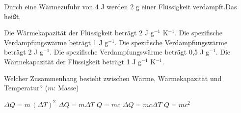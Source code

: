 \documentclass[11pt]{exam}
\begin{document}
\begin{questions}
\vspace{3mm}\question Durch eine Wärmezufuhr von 4 J werden 2 g einer Flüssigkeit verdampft.Das heißt,

\begin{choices}
	\choice Die Wärmekapazität der Flüssigkeit beträgt 2 J g\(^{-1}\) K\(^{-1}\).
	\choice Die spezifische Verdampfungswärme beträgt 1 J g\(^{-1}\).
	\choice Die spezifische Verdampfungswärme beträgt 2 J g\(^{-1}\).
	\choice Die spezifische Verdampfungswärme beträgt 0,5 J g\(^{-1}\).
	\choice Die Wärmekapazität der Flüssigkeit beträgt 1 J g\(^{-1}\) K\(^{-1}\).
\end{choices}

\vspace{3mm}\question Welcher Zusammenhang besteht zwischen Wärme, Wärmekapazität und Temperatur? (\(m\): Masse)

\begin{choices}
	\choice \(\Delta Q = m \, (\Delta T)^2\)
	\choice \(\Delta Q = m \Delta T\)
	\choice \(Q = m c\)
	\choice \(\Delta Q = m c \Delta T\)
	\choice \(Q = m c^2\)
\end{choices}

\vspace{3mm}\end{questions}
\end{document}
